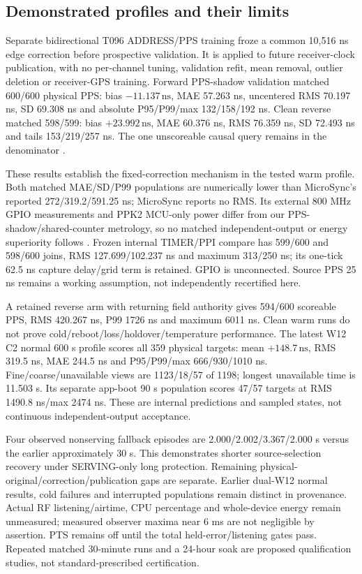 \documentclass[11pt,letterpaper]{article}
\newcommand{\ns}{\,\mathrm{ns}}
\newcommand{\page}{\clearpage}
\begin{document}
\page
\subsection{Demonstrated profiles and their limits}
Separate bidirectional T096 ADDRESS/PPS training froze a common 10,516 ns edge correction before prospective validation. It is applied to future receiver-clock publication, with no per-channel tuning, validation refit, mean removal, outlier deletion or receiver-GPS training. Forward PPS-shadow validation matched 600/600 physical PPS: bias $-11.137\ns$, MAE 57.263 ns, uncentered RMS 70.197 ns, SD 69.308 ns and absolute P95/P99/max 132/158/192 ns. Clean reverse matched 598/599: bias $+23.992\ns$, MAE 60.376 ns, RMS 76.359 ns, SD 72.493 ns and tails 153/219/257 ns. The one unscoreable causal query remains in the denominator \cite{evidence}.

These results establish the fixed-correction mechanism in the tested warm profile. Both matched MAE/SD/P99 populations are numerically lower than MicroSync's reported 272/319.2/591.25 ns; MicroSync reports no RMS. Its external 800 MHz GPIO measurements and PPK2 MCU-only power differ from our PPS-shadow/shared-counter metrology, so no matched independent-output or energy superiority follows \cite{micro}. Frozen internal TIMER/PPI compare has 599/600 and 598/600 joins, RMS 127.699/102.237 ns and maximum 313/250 ns; its one-tick 62.5 ns capture delay/grid term is retained. GPIO is unconnected. Source PPS 25 ns remains a working assumption, not independently recertified here.

A retained reverse arm with returning field authority gives 594/600 scoreable PPS, RMS 420.267 ns, P99 1726 ns and maximum 6011 ns. Clean warm runs do not prove cold/reboot/loss/holdover/temperature performance. The latest W12 C2 normal 600 s profile scores all 359 physical targets: mean $+148.7\ns$, RMS 319.5 ns, MAE 244.5 ns and P95/P99/max 666/930/1010 ns. Fine/coarse/unavailable views are 1123/18/57 of 1198; longest unavailable time is 11.503 s. Its separate app-boot 90 s population scores 47/57 targets at RMS 1490.8 ns/max 2474 ns. These are internal predictions and sampled states, not continuous independent-output acceptance.

Four observed nonserving fallback episodes are 2.000/2.002/3.367/2.000 s versus the earlier approximately 30 s. This demonstrates shorter source-selection recovery under SERVING-only long protection. Remaining physical-original/correction/publication gaps are separate. Earlier dual-W12 normal results, cold failures and interrupted populations remain distinct in provenance. Actual RF listening/airtime, CPU percentage and whole-device energy remain unmeasured; measured observer maxima near 6 ms are not negligible by assertion. PTS remains off until the total held-error/listening gates pass. Repeated matched 30-minute runs and a 24-hour soak are proposed qualification studies, not standard-prescribed certification.
\end{document}
